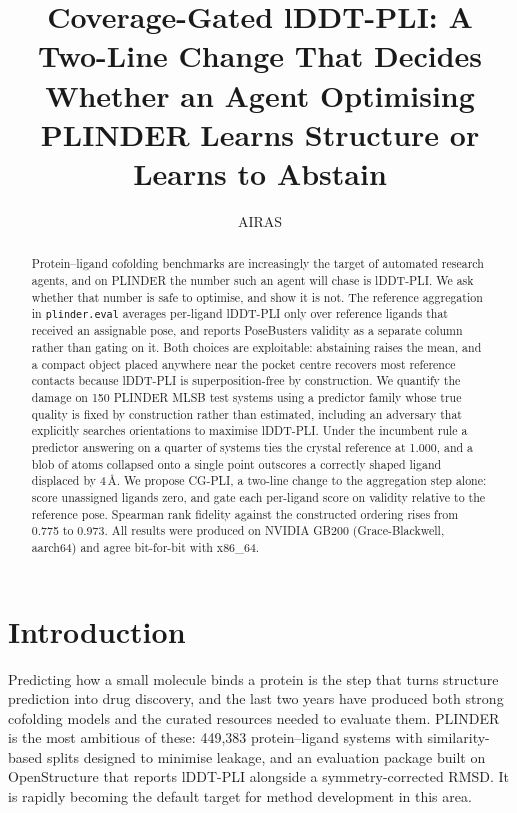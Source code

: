 \documentclass{article} %
\title{Coverage-Gated lDDT-PLI: A Two-Line Change That Decides Whether an Agent Optimising PLINDER Learns Structure or Learns to Abstain}
\author{AIRAS}
\begin{document}
\maketitle

\begin{abstract}
Protein--ligand cofolding benchmarks are increasingly the target of automated research
agents, and on PLINDER the number such an agent will chase is lDDT-PLI. We ask whether
that number is safe to optimise, and show it is not. The reference aggregation in
\texttt{plinder.eval} averages per-ligand lDDT-PLI only over reference ligands that
received an assignable pose, and reports PoseBusters validity as a separate column
rather than gating on it. Both choices are exploitable: abstaining raises the mean, and
a compact object placed anywhere near the pocket centre recovers most reference contacts
because lDDT-PLI is superposition-free by construction. We quantify the damage on 150
PLINDER MLSB test systems using a predictor family whose true quality is fixed by
construction rather than estimated, including an adversary that explicitly searches
orientations to maximise lDDT-PLI. Under the incumbent rule a predictor answering on a
quarter of systems ties the crystal reference at 1.000, and a blob of atoms collapsed
onto a single point outscores a correctly shaped ligand displaced by 4\,\AA{}. We propose
CG-PLI, a two-line change to the aggregation step alone: score unassigned ligands zero,
and gate each per-ligand score on validity relative to the reference pose. Spearman rank
fidelity against the constructed ordering rises from 0.775 to 0.973. All results were
produced on NVIDIA GB200 (Grace-Blackwell, aarch64) and agree bit-for-bit with x86\_64.
\end{abstract}

\section{Introduction}
\label{sec:intro}
Predicting how a small molecule binds a protein is the step that turns structure
prediction into drug discovery, and the last two years have produced both strong
cofolding models \citep{abramson-2024-accurate} and the curated resources needed to evaluate
them. PLINDER \citep{durairaj-2024-plinder} is the most ambitious of these: 449{,}383
protein--ligand systems with similarity-based splits designed to minimise leakage, and
an evaluation package built on OpenStructure that reports lDDT-PLI alongside a
symmetry-corrected RMSD. It is rapidly becoming the default target for method
development in this area.
\end{document}

